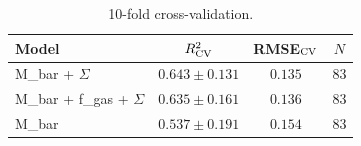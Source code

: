 \begin{table}[htbp]
\centering
\caption{10-fold cross-validation.}
\label{tab:cv}
\begin{tabular}{lccc}
\hline
Model & $R^2_{\rm CV}$ & RMSE$_{\rm CV}$ & $N$ \\
\hline
M\_bar + $\Sigma$ & $0.643\pm0.131$ & $0.135$ & 83 \\
M\_bar + f\_gas + $\Sigma$ & $0.635\pm0.161$ & $0.136$ & 83 \\
M\_bar & $0.537\pm0.191$ & $0.154$ & 83 \\
\hline
\end{tabular}
\end{table}
